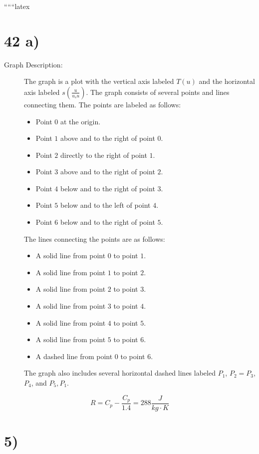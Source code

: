 
``````latex


\section*{42 a)}

\begin{description}
    \item[Graph Description:] The graph is a plot with the vertical axis labeled $T(u)$ and the horizontal axis labeled $s(\frac{u}{u_s u})$. The graph consists of several points and lines connecting them. The points are labeled as follows:
    \begin{itemize}
        \item Point $0$ at the origin.
        \item Point $1$ above and to the right of point $0$.
        \item Point $2$ directly to the right of point $1$.
        \item Point $3$ above and to the right of point $2$.
        \item Point $4$ below and to the right of point $3$.
        \item Point $5$ below and to the left of point $4$.
        \item Point $6$ below and to the right of point $5$.
    \end{itemize}
    The lines connecting the points are as follows:
    \begin{itemize}
        \item A solid line from point $0$ to point $1$.
        \item A solid line from point $1$ to point $2$.
        \item A solid line from point $2$ to point $3$.
        \item A solid line from point $3$ to point $4$.
        \item A solid line from point $4$ to point $5$.
        \item A solid line from point $5$ to point $6$.
        \item A dashed line from point $0$ to point $6$.
    \end{itemize}
    The graph also includes several horizontal dashed lines labeled $P_1$, $P_2 = P_3$, $P_4$, and $P_5, P_1$.
\end{description}

\[
R = C_p - \frac{C_p}{1.4} = 288 \frac{J}{kg \cdot K}
\]

\section*{5)}

